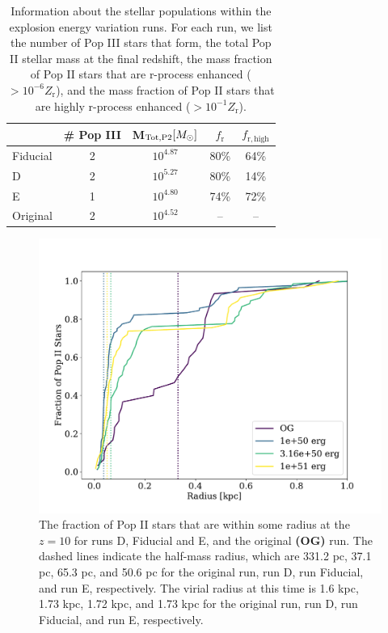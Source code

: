 \documentclass[fleqn,usenatbib]{mnras}
\begin{document}
\begin{table}
	\centering
	\begin{tabular}{lcccc} 
		\hline
		 & \# Pop III & M$_{\mathrm{Tot, P2}} [\Ms]$ & $f_{\mathrm{r}}$ & $f_{\mathrm{r, high}}$ \\
		\hline
		Fiducial & 2 & $10^{4.87}$ & 80\% & 64\% \\
		D & 2 & $10^{5.27}$ & 80\% & 14\% \\
		E & 1 & $10^{4.80}$ & 74\% & 72\% \\
		Original & 2 & $10^{4.52}$ & -- & -- \\
		\hline
	\end{tabular}
	\caption[Information about the stellar populations within the explosion energy variation runs.]{Information about the stellar populations within the explosion energy variation runs. For each run, we list the number of Pop III stars that form, the total Pop II stellar mass at the final redshift, the mass fraction of Pop II stars that are r-process enhanced ($> 10^{-6} Z_{\mathrm{r}}$), and the mass fraction of Pop II stars that are highly r-process enhanced ($> 10^{-1} Z_{\mathrm{r}}$).}
	\label{tab:eng_stellar}
\end{table}

\begin{figure} 
	\includegraphics[width=\columnwidth]{plots/eng_stellar_dist.pdf}
	\caption[Radial distribution of Pop II stars for each explosion energy variation run.]{The fraction of Pop II stars that are within some radius at the $z = 10$ for runs D, Fiducial and E, and the original \textbf{(OG)} run. The dashed lines indicate the half-mass radius, which are 331.2 pc, 37.1 pc, 65.3 pc, and 50.6 pc for the original run, run D, run Fiducial, and run E, respectively. The virial radius at this time is 1.6 kpc, 1.73 kpc, 1.72 kpc, and 1.73 kpc for the original run, run D, run Fiducial, and run E, respectively.}
	\label{fig:eng_stellar_dist}
\end{figure}
\end{document}
